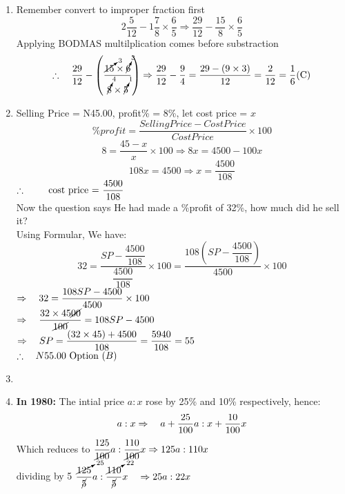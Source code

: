 \begin{multicols}{2}
\begin{enumerate}[label={\arabic*.}]
    \item Remember convert to improper fraction first
    \[2\frac{5}{12} - 1\frac{7}{8} \times \frac{6}{5} \Rightarrow \frac{29}{12} - \frac{15}{8} \times \frac{6}{5}\]
    Applying BODMAS multilplication comes before substraction\\
    \[\therefore \hspace{10px} \dfrac{29}{12} - \left(\dfrac{\cancelto{3}{15} \times \cancelto{3}{6}}{\cancelto{4}{8} \times \cancelto{1}{5}}\right) \Rightarrow \dfrac{29}{12} - \dfrac{9}{4} = \dfrac{29 - (9 \times 3)}{12} = \frac{2}{12} = \frac{1}{6} \text{(C)}\]
    \item Selling Price = N45.00, profit\% = 8\%, let cost price = \(x\)
       \[ \%profit = \frac{Selling Price - Cost Price }{Cost Price} \times 100 \]
       \[8 = \frac{45 - x }{x} \times 100 \Rightarrow 8x = 4500 -100x\]
       \[108x = 4500 \Rightarrow x = \dfrac{4500}{108}  \]
       \(\therefore \hspace{20px} \text{ cost price = }\dfrac{4500}{108}\) \\
       Now the question says He had made a \%profit of 32\%, how much did he sell it? \\
       Using Formular, We have: 
       \[32 = \frac{SP - \dfrac{4500}{108}}{\dfrac{4500}{108}} \times 100 =  \frac{108\left(SP - \dfrac{4500}{108}\right)}{4500} \times 100\]
       \(\Rightarrow \hspace {10px} 32 =  \dfrac{108SP - 4500}{4500} \times 100 \) \\
       \(\Rightarrow \hspace{10px} \dfrac{32 \times 45\cancel{00}}{\cancel{100}} = 108SP - 4500\) \\
       \(\Rightarrow  \hspace{10px} SP = \dfrac{\left(32 \times 45\right) + 4500}{108} = \dfrac{5940}{108} = 55\) \vspace{5px}\\
       \(\therefore \hspace{10px} N55.00 \text{ Option } (B)\)
    \item 
    \item \textbf{In 1980:} The intial price \(a : x\) rose by 25\% and 10\% respectively, hence:
    \[a:x \Rightarrow \hspace{10px} a + \dfrac{25}{100}a : x + \dfrac{10}{100}x\]
    Which reduces to \(\dfrac{125}{\cancel{100}}a : \dfrac{110}{\cancel{100}}x \Rightarrow {125}a : 110x  \) \vspace{5px} \\
    dividing by 5 \( \dfrac{\cancelto{25}{125}}{\cancel{5}} a : \dfrac{\cancelto{22}{110}}{\cancel{5}} x \hspace {10px}\Rightarrow 25a : 22x \) \vspace{5px}\\

\end{enumerate}
\end{multicols}
